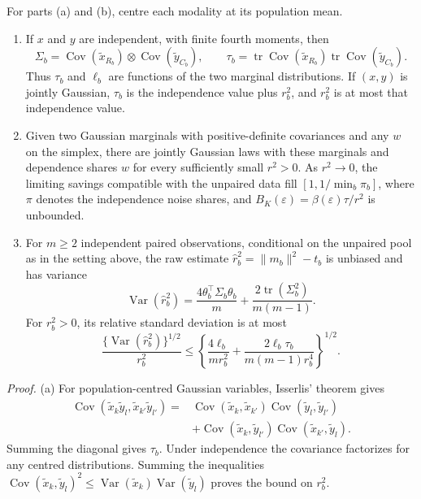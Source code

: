 \begin{proposition}\label{prop:reveal}
For parts (a) and (b), centre each modality at its population mean.
\begin{enumerate}
\item[(a)] If $x$ and $y$ are independent, with finite fourth moments, then
\[
\Sigma_b=\operatorname{Cov}(\tilde x_{R_b})\otimes\operatorname{Cov}(\tilde y_{C_b}),\qquad
\tau_b=\operatorname{tr}\operatorname{Cov}(\tilde x_{R_b})\operatorname{tr}\operatorname{Cov}(\tilde y_{C_b}).
\]
Thus $\tau_b$ and $\ell_b$ are functions of the two marginal distributions. If $(x,y)$ is jointly Gaussian, $\tau_b$ is the independence value plus $r_b^2$, and $r_b^2$ is at most that independence value.
\item[(b)] Given two Gaussian marginals with positive-definite covariances and any $w$ on the simplex, there are jointly Gaussian laws with these marginals and dependence shares $w$ for every sufficiently small $r^2>0$. As $r^2\to0$, the limiting savings compatible with the unpaired data fill $[1,1/\min_b\pi_b]$, where $\pi$ denotes the independence noise shares, and $B_K(\varepsilon)=\beta(\varepsilon)\tau/r^2$ is unbounded.
\item[(c)] For $m\ge2$ independent paired observations, conditional on the unpaired pool as in the setting above, the raw estimate $\widehat r_b^2=\|m_b\|^2-t_b$ is unbiased and has variance
\[
\operatorname{Var}(\widehat r_b^2)
=\frac{4\theta_b^\top\Sigma_b\theta_b}{m}
+\frac{2\operatorname{tr}(\Sigma_b^2)}{m(m-1)}.
\]
For $r_b^2>0$, its relative standard deviation is at most
\[
\frac{\{\operatorname{Var}(\widehat r_b^2)\}^{1/2}}{r_b^2}
\le\left\{\frac{4\ell_b}{m r_b^2}
+\frac{2\ell_b\tau_b}{m(m-1)r_b^4}\right\}^{1/2}.
\]
\end{enumerate}
\end{proposition}
\noindent\textit{Proof.} (a) For population-centred Gaussian variables, Isserlis' theorem\cite{isserlis1918} gives
\[
\begin{aligned}
\operatorname{Cov}(\tilde x_k\tilde y_l,\tilde x_{k'}\tilde y_{l'})
={}&\operatorname{Cov}(\tilde x_k,\tilde x_{k'})\operatorname{Cov}(\tilde y_l,\tilde y_{l'})\\
&+\operatorname{Cov}(\tilde x_k,\tilde y_{l'})\operatorname{Cov}(\tilde x_{k'},\tilde y_l).
\end{aligned}
\]
Summing the diagonal gives $\tau_b$. Under independence the covariance factorizes for any centred distributions. Summing the inequalities $\operatorname{Cov}(\tilde x_k,\tilde y_l)^2\le\operatorname{Var}(\tilde x_k)\operatorname{Var}(\tilde y_l)$ proves the bound on $r_b^2$.

